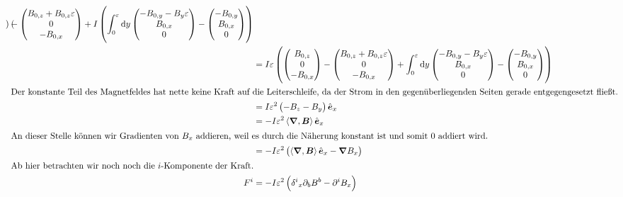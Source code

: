 \documentclass[11pt, ngerman, fleqn]{article}
\newcommand{\divergence}[1]{\inner{\vnabla}{#1}}
\newcommand{\ev}{\hat{\vec e}}
\newcommand{\inner}[2]{\left\langle #1, #2 \right\rangle}
\newcommand{\vnabla}{\vec \nabla}
\renewcommand{\vec}[1]{\boldsymbol{#1}}
\begin{document}
\begin{align*}
{\begin{pmatrix}
	\end{pmatrix}
	-
	\begin{pmatrix}
		B_{0,z} + B_{0,z} \varepsilon \\ 0 \\ - B_{0,x}
	\end{pmatrix}
	}
	+
	I \del{
	\int_0^\varepsilon \dif y
	\begin{pmatrix}
		- B_{0,y} - B_y \varepsilon \\ B_{0,x} \\ 0
	\end{pmatrix}
	-
	\begin{pmatrix}
		- B_{0,y} \\ B_{0,x} \\ 0
	\end{pmatrix}
	} \\
	&=
	I \varepsilon \del{
	\begin{pmatrix}
		B_{0,z} \\ 0 \\ - B_{0,x}
	\end{pmatrix}
	-
	\begin{pmatrix}
		B_{0,z} + B_{0,z} \varepsilon \\ 0 \\ - B_{0,x}
	\end{pmatrix}
	+
	\int_0^\varepsilon \dif y
	\begin{pmatrix}
		- B_{0,y} - B_y \varepsilon \\ B_{0,x} \\ 0
	\end{pmatrix}
	-
	\begin{pmatrix}
		- B_{0,y} \\ B_{0,x} \\ 0
	\end{pmatrix}
	} \\
	\intertext{Der konstante Teil des Magnetfeldes hat nette keine Kraft auf die Leiterschleife, da der Strom in den gegenüberliegenden Seiten gerade entgegengesetzt fließt.}
	&= I \varepsilon^2 \del{-B_z - B_y} \ev_x \\
	&= - I \varepsilon^2 \divergence{\vec B} \ev_x \\
	\intertext{An dieser Stelle können wir Gradienten von $B_x$ addieren, weil es durch die Näherung konstant ist und somit 0 addiert wird.}
	&= - I \varepsilon^2 \del{\divergence{\vec B} \ev_x - \vnabla B_x} \\
	\intertext{Ab hier betrachten wir noch noch die $i$-Komponente der Kraft.}
	F^i
	&= - I \varepsilon^2 \del{\delta^i{}_x \partial_b B^b - \partial^i B_x} \\

\end{align*}
\end{document}
